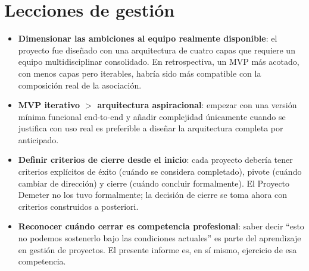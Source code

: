 \section{Lecciones de gesti\'on}

\begin{itemize}[leftmargin=*]
    \item \textbf{Dimensionar las ambiciones al equipo realmente
    disponible}: el proyecto fue dise\~nado con una arquitectura de
    cuatro capas que requiere un equipo multidisciplinar consolidado.
    En retrospectiva, un MVP m\'as acotado, con menos capas pero
    iterables, habr\'ia sido m\'as compatible con la composici\'on real
    de la asociaci\'on.

    \item \textbf{MVP iterativo $>$ arquitectura aspiracional}: empezar
    con una versi\'on m\'inima funcional end-to-end y a\~nadir complejidad
    \'unicamente cuando se justifica con uso real es preferible a
    dise\~nar la arquitectura completa por anticipado.

    \item \textbf{Definir criterios de cierre desde el inicio}: cada
    proyecto deber\'ia tener criterios expl\'icitos de \'exito (cu\'ando
    se considera completado), pivote (cu\'ando cambiar de direcci\'on)
    y cierre (cu\'ando concluir formalmente). El Proyecto Demeter no
    los tuvo formalmente; la decisi\'on de cierre se toma ahora con
    criterios construidos a posteriori.

    \item \textbf{Reconocer cu\'ando cerrar es competencia profesional}:
    saber decir ``esto no podemos sostenerlo bajo las condiciones
    actuales'' es parte del aprendizaje en gesti\'on de proyectos. El
    presente informe es, en s\'i mismo, ejercicio de esa competencia.
\end{itemize}
